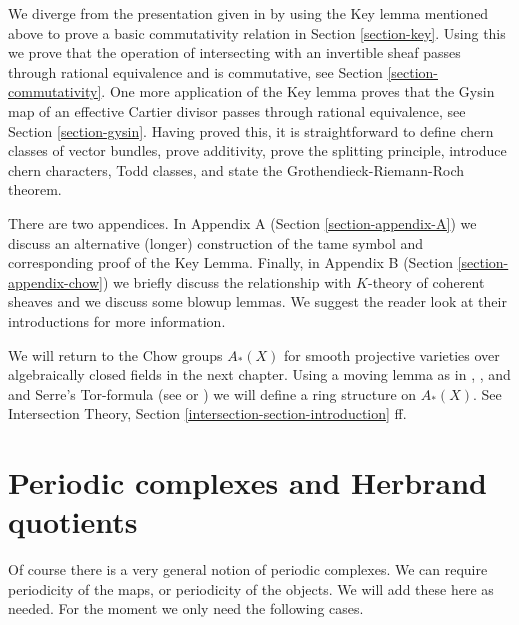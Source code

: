 \medskip\noindent
We diverge from the presentation given in \cite{F} by using the
Key lemma mentioned above to prove a basic commutativity relation in
Section \ref{section-key}. Using this we prove that the operation
of intersecting with an invertible sheaf passes through rational
equivalence and is commutative, see Section \ref{section-commutativity}.
One more application of the Key
lemma proves that the Gysin map of an effective Cartier divisor
passes through rational equivalence, see Section \ref{section-gysin}.
Having proved this, it is straightforward to define chern
classes of vector bundles, prove additivity, prove the splitting principle,
introduce chern characters, Todd classes, and state the
Grothendieck-Riemann-Roch theorem.

\medskip\noindent
There are two appendices. In Appendix A (Section \ref{section-appendix-A})
we discuss an alternative (longer) construction of the
tame symbol and corresponding proof of the Key Lemma.
Finally, in Appendix B (Section \ref{section-appendix-chow})
we briefly discuss the relationship with $K$-theory of coherent
sheaves and we discuss some blowup lemmas.
We suggest the reader look at their introductions for
more information.

\medskip\noindent
We will return to the Chow groups $A_*(X)$ for smooth projective varieties
over algebraically closed fields in the next chapter. Using a moving
lemma as in \cite{Samuel}, \cite{ChevalleyI}, and \cite{ChevalleyII}
and Serre's Tor-formula
(see \cite{Serre_local_algebra} or \cite{Serre_algebre_locale})
we will define a ring structure on $A_*(X)$. See
Intersection Theory, Section \ref{intersection-section-introduction} ff.








\section{Periodic complexes and Herbrand quotients}
\label{section-periodic-complexes}

\noindent
Of course there is a very general notion of periodic complexes.
We can require periodicity of the maps, or periodicity of the objects.
We will add these here as needed. For the moment we only need
the following cases.


